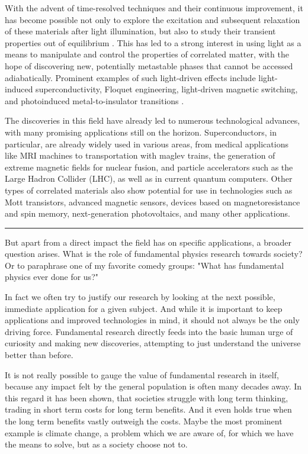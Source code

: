 With the advent of time-resolved techniques and their continuous improvement, it has become possible not only to explore the excitation and subsequent relaxation of these materials after light illumination, but also to study their transient properties out of equilibrium \cite{giannetti_ultrafast_2016}.
This has led to a strong interest in using light as a means to manipulate and control the properties of correlated matter, with the hope of discovering new, potentially metastable phases that cannot be accessed adiabatically.
Prominent examples of such light-driven effects include light-induced superconductivity, Floquet engineering, light-driven magnetic switching, and photoinduced metal-to-insulator transitions \cite{fausti_light-induced_2011,takubo_photoinduced_2008}.

The discoveries in this field have already led to numerous technological advances, with many promising applications still on the horizon.
Superconductors, in particular, are already widely used in various areas, from medical applications like MRI machines to transportation with maglev trains, the generation of extreme magnetic fields for nuclear fusion, and particle accelerators such as the Large Hadron Collider (LHC), as well as in current quantum computers.
Other types of correlated materials also show potential for use in technologies such as Mott transistors, advanced magnetic sensors, devices based on magnetoresistance and spin memory, next-generation photovoltaics, and many other applications.

\begin{center}
	\rule{0.3\textwidth}{.8pt}
\end{center}

But apart from a direct impact the field has on specific applications, a broader question arises.
What is the role of fundamental physics research towards society?
Or to paraphrase one of my favorite comedy groups: "What has fundamental physics ever done for us?"

In fact we often try to justify our research by looking at the next possible, immediate application for a given subject.
And while it is important to keep applications and improved technologies in mind, it should not always be the only driving force.
Fundamental research directly feeds into the basic human urge of curiosity and making new discoveries, attempting to just understand the universe better than before.

It is not really possible to gauge the value of fundamental research in itself, because any impact felt by the general population is often many decades away.
In this regard it has been shown, that societies struggle with long term thinking, trading in short term costs for long term benefits.
And it even holds true when the long term benefits vastly outweigh the costs.
Maybe the most prominent example is climate change, a problem which we are aware of, for which we have the means to solve, but as a society choose not to.

